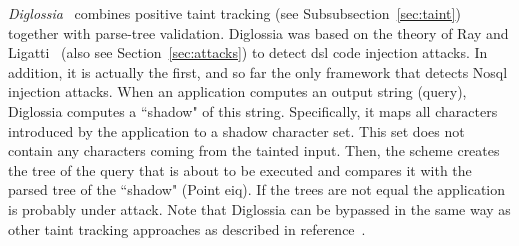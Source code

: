 \documentclass[conference]{IEEEtran}
\begin{document}
{\it Diglossia}~\cite{SMS13} combines positive taint tracking (see
Subsubsection~\ref{sec:taint}) together with parse-tree validation.
Diglossia was based on the theory of Ray and Ligatti~\cite{RL12b}
(also see Section~\ref{sec:attacks}) to detect {\sc dsl} code
injection attacks. In addition, it is actually the first, and so far
the only framework that detects No{\sc sql} injection attacks. When an
application computes an output string (query), Diglossia computes a
``shadow" of this string. Specifically, it maps all characters
introduced by the application to a shadow character set. This set does
not contain any characters coming from the tainted input. Then, the
scheme creates the tree of the query that is about to be executed and
compares it with the parsed tree of the ``shadow" (Point {\sc e}i{\sc q}). If
the trees are not equal the application is probably under attack. Note
that Diglossia can be bypassed in the same way as other taint
tracking approaches as described in reference~\cite{NBR14}.
\end{document}
